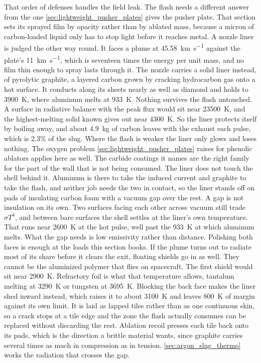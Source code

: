 \documentclass{article}
\begin{document}
That order of defenses handles the field leak. The flash needs a different answer from the one \autoref{sec:lightweight_pusher_plates} gives the pusher plate. That section sets its sprayed film by opacity rather than by ablated mass, because a micron of carbon-loaded liquid only has to stop light before it reaches metal. A nozzle liner is judged the other way round. It faces a plume at \SI{45.58}{\kilo\meter\per\second} against the plate's \SI{11}{\kilo\meter\per\second}, which is seventeen times the energy per unit mass, and no film thin enough to spray lasts through it. The nozzle carries a solid liner instead, of pyrolytic graphite, a layered carbon grown by cracking hydrocarbon gas onto a hot surface. It conducts along its sheets nearly as well as diamond and holds to \SI{3900}{\kelvin}, where aluminum melts at \SI{933}{\kelvin}. Nothing survives the flash untouched. A surface in radiative balance with the peak flux would sit near \SI{23500}{\kelvin}, and the highest-melting solid known gives out near \SI{4300}{\kelvin}. So the liner protects itself by boiling away, and about \SI{4.9}{\kilogram} of carbon leaves with the exhaust each pulse, which is 2.3\% of the slug. Where the flash is weaker the liner only glows and loses nothing. The oxygen problem \autoref{sec:lightweight_pusher_plates} raises for phenolic ablators applies here as well. The carbide coatings it names are the right family for the part of the wall that is not being consumed. The liner does not touch the shell behind it. Aluminum is there to take the induced current and graphite to take the flash, and neither job needs the two in contact, so the liner stands off on pads of insulating carbon foam with a vacuum gap over the rest. A gap is not insulation on its own. Two surfaces facing each other across vacuum still trade $\sigma T^4$, and between bare surfaces the shell settles at the liner's own temperature. That runs near \SI{2600}{\kelvin} at the hot pulse, well past the \SI{933}{\kelvin} at which aluminum melts. What the gap needs is low emissivity rather than distance. Polishing both faces is enough at the loads this section books. If the plume turns out to radiate most of its share before it clears the exit, floating shields go in as well. They cannot be the aluminized polymer that flies on spacecraft. The first shield would sit near \SI{2900}{\kelvin}. Refractory foil is what that temperature allows, tantalum melting at \SI{3290}{\kelvin} or tungsten at \SI{3695}{\kelvin}. Blocking the back face makes the liner shed inward instead, which raises it to about \SI{3100}{\kelvin} and leaves \SI{800}{\kelvin} of margin against its own limit. It is laid as lapped tiles rather than as one continuous skin, so a crack stops at a tile edge and the zone the flash actually consumes can be replaced without discarding the rest. Ablation recoil presses each tile back onto its pads, which is the direction a brittle material wants, since graphite carries several times as much in compression as in tension. \autoref{sec:argon_slug_thermo} works the radiation that crosses the gap.
\end{document}
